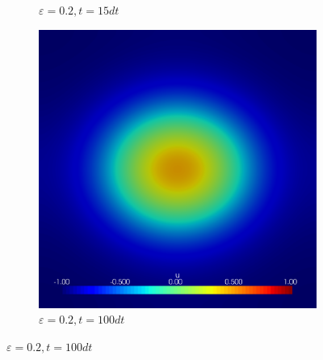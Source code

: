 \begin{figure}[h]
\begin{subfigure}[b]{0.3\linewidth}
		\caption{$ \varepsilon = 0.2, t = 15dt $}
	\end{subfigure}
	\hfill
	\begin{subfigure}[b]{0.3\linewidth}
		\includegraphics[width=\linewidth]{numerical_simulation/dumbel/eps_0.2000101.vtu}
		\caption{$ \varepsilon = 0.2, t =  100dt $}
	\end{subfigure}
	

\end{figure}
